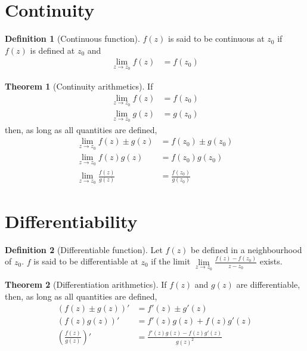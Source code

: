 \documentclass[titlepage, fleqn, a4paper, 12pt, twoside]{article}
\theoremstyle{definition}
\newtheorem{definition}{Definition}
\theoremstyle{theorem}
\newtheorem{theorem}{Theorem}
\begin{document}
\section{Continuity}

\begin{definition}[Continuous function]
	$f(z)$ is said to be continuous at $z_0$ if $f(z)$ is defined at $z_0$ and 
	\begin{align*}
		\lim\limits_{z \to z_0} f(z) & = f(z_0)
	\end{align*}
\end{definition}

\begin{theorem}[Continuity arithmetics]
	If
	\begin{align*}
		\lim\limits_{z \to z_0} f(z) & = f(z_0) \\
		\lim\limits_{z \to z_0} g(z) & = g(z_0)
	\end{align*}
	then, as long as all quantities are defined,
	\begin{align*}
		\lim\limits_{z \to z_0} f(z) \pm g(z)     & = f(z_0) \pm g(z_0) \\
		\lim\limits_{z \to z_0} f(z) g(z)         & = f(z_0) g(z_0)     \\
		\lim\limits_{z \to z_0} \frac{f(z)}{g(z)} & = \frac{f(z_0)}{g(z_0)}
	\end{align*}
\end{theorem}

\section{Differentiability}

\begin{definition}[Differentiable function]
	Let $f(z)$ be defined in a neighbourhood of $z_0$.
	$f$ is said to be differentiable at $z_0$ if the limit $\lim\limits_{z \to z_0} \frac{f(z) - f(z_0)}{z - z_0}$ exists.
\end{definition}

\begin{theorem}[Differentiation arithmetics]
	If $f(z)$ and $g(z)$ are differentiable, then, as long as all quantities are defined,
	\begin{align*}
		\left( f(z) \pm g(z) \right)'     & = f'(z) \pm g'(z)         \\
		\left( f(z) g(z) \right)'         & = f'(z) g(z) + f(z) g'(z) \\
		\left( \frac{f(z)}{g(z)} \right)' & = \frac{f'(z) g(z) - f(z) g'(z)}{{g(z)}^2}
	\end{align*}
\end{theorem}
\end{document}
